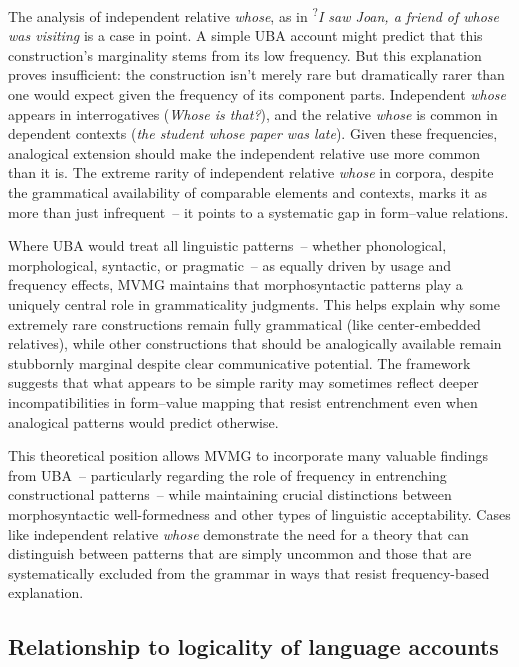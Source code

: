 \documentclass[12pt,letterpaper]{article}
\newcommand{\mention}[1]{\textit{#1}}
\begin{document}
The analysis of independent relative \mention{whose}, as in \textsuperscript{?}\textit{I saw Joan, a friend of whose was visiting} is a case in point. A simple UBA account might predict that this construction's marginality stems from its low frequency. But this explanation proves insufficient: the construction isn't merely rare but dramatically rarer than one would expect given the frequency of its component parts. Independent \mention{whose} appears in interrogatives (\mention{Whose is that?}), and the relative \mention{whose} is common in dependent contexts (\mention{the student whose paper was late}). Given these frequencies, analogical extension should make the independent relative use more common than it is. The extreme rarity of independent relative \mention{whose} in corpora, despite the grammatical availability of comparable elements and contexts, marks it as more than just infrequent~--  it points to a systematic gap in form--value relations.

Where UBA would treat all linguistic patterns~--  whether phonological, morphological, syntactic, or pragmatic~--  as equally driven by usage and frequency effects, MVMG maintains that morphosyntactic patterns play a uniquely central role in grammaticality judgments. This helps explain why some extremely rare constructions remain fully grammatical (like center-embedded relatives), while other constructions that should be analogically available remain stubbornly marginal despite clear communicative potential. The framework suggests that what appears to be simple rarity may sometimes reflect deeper incompatibilities in form--value mapping that resist entrenchment even when analogical patterns would predict otherwise.

This theoretical position allows MVMG to incorporate many valuable findings from UBA~--  particularly regarding the role of frequency in entrenching constructional patterns~--  while maintaining crucial distinctions between morphosyntactic well-formedness and other types of linguistic acceptability. Cases like independent relative \mention{whose} demonstrate the need for a theory that can distinguish between patterns that are simply uncommon and those that are systematically excluded from the grammar in ways that resist frequency-based explanation.

\subsection{Relationship to logicality of language accounts}
\end{document}
